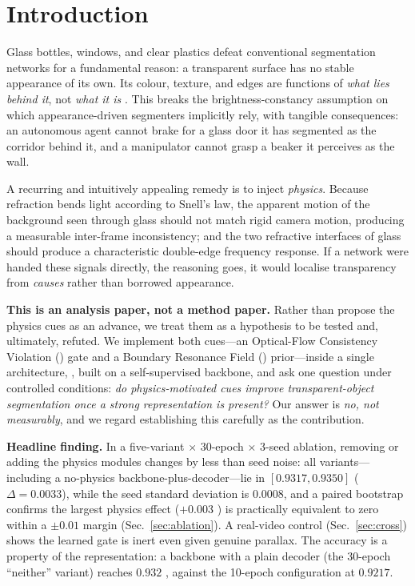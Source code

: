 \section{Introduction}
Glass bottles, windows, and clear plastics defeat conventional segmentation
networks for a fundamental reason: a transparent surface has no stable
appearance of its own. Its colour, texture, and edges are functions of
\emph{what lies behind it}, not \emph{what it is} \cite{xie2020translab}. This
breaks the brightness-constancy assumption on which appearance-driven segmenters
implicitly rely, with tangible consequences: an autonomous agent cannot brake
for a glass door it has segmented as the corridor behind it, and a manipulator
cannot grasp a beaker it perceives as the wall.

A recurring and intuitively appealing remedy is to inject \emph{physics}.
Because refraction bends light according to Snell's law, the apparent motion of
the background seen through glass should not match rigid camera motion,
producing a measurable inter-frame inconsistency; and the two refractive
interfaces of glass should produce a characteristic double-edge frequency
response. If a network were handed these signals directly, the reasoning goes,
it would localise transparency from \emph{causes} rather than borrowed
appearance.

\textbf{This is an analysis paper, not a method paper.} Rather than propose the
physics cues as an advance, we treat them as a hypothesis to be tested and,
ultimately, refuted. We implement both cues---an Optical-Flow Consistency
Violation (\ofcv) gate and a Boundary Resonance Field (\brf) prior---inside a
single architecture, \spectra, built on a self-supervised backbone, and ask one
question under controlled conditions: \emph{do physics-motivated cues improve
transparent-object segmentation once a strong representation is present?} Our
answer is \emph{no, not measurably}, and we regard establishing this carefully
as the contribution.

\textbf{Headline finding.} In a five-variant $\times$ 30-epoch $\times$ 3-seed
ablation, removing or adding the physics modules changes \iou{} by less than
seed noise: all variants---including a no-physics backbone-plus-decoder---lie in
$[0.9317,0.9350]$ ($\Delta=0.0033$), while the seed standard deviation is
$0.0008$, and a paired bootstrap confirms the largest physics effect
($+0.003$ \iou) is practically equivalent to zero within a $\pm0.01$ margin
(Sec.~\ref{sec:ablation}). A real-video control (Sec.~\ref{sec:cross})
shows the learned \ofcv{} gate is inert even given genuine parallax. The
accuracy is a property of the representation: a \dinov{} backbone with a plain
decoder (the 30-epoch ``neither'' variant) reaches $0.932$ \iou, against the
10-epoch \spectra{} configuration at $0.9217$.

